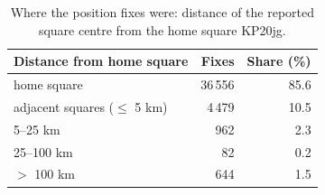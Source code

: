 \begin{table}[htbp]\centering\small
\caption{Where the position fixes were: distance of the reported square centre from the home square KP20jg.}\label{tab:wdist}
\begin{tabular}{lrr}
\toprule
Distance from home square & Fixes & Share (\%) \\
\midrule
home square & 36\,556 & 85.6 \\
adjacent squares ($\leq$ 5 km) & 4\,479 & 10.5 \\
5--25 km & 962 & 2.3 \\
25--100 km & 82 & 0.2 \\
$>$ 100 km & 644 & 1.5 \\
\bottomrule
\end{tabular}
\end{table}
